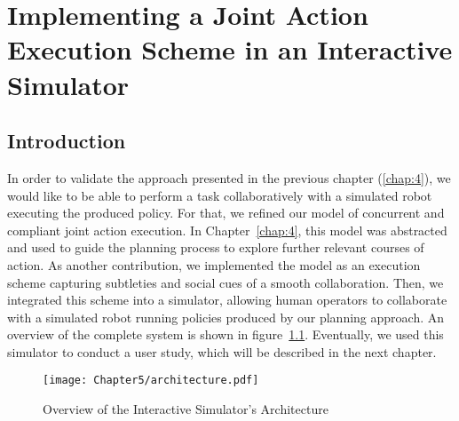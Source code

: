 \cleardoublepage

\ifdefined{}
\else
\setcounter{chapter}{4} %
\dominitoc
\faketableofcontents
\fi

\chapter{Implementing a Joint Action Execution Scheme in an Interactive Simulator}
\label{chap:5}
\minitoc


\section{Introduction}

In order to validate the approach presented in the previous chapter (\ref{chap:4}), we would like to be able to perform a task collaboratively with a simulated robot executing the produced policy.
For that, we refined our model of concurrent and compliant joint action execution. In Chapter~\ref{chap:4}, this model was abstracted and used to guide the planning process to explore further relevant courses of action. As another contribution, we implemented the model as an execution scheme capturing subtleties and social cues of a smooth collaboration. Then, we integrated this scheme into a simulator, allowing human operators to collaborate with a simulated robot running policies produced by our planning approach. An overview of the complete system is shown in figure~\ref{fig:architecture}.
Eventually, we used this simulator to conduct a user study, which will be described in the next chapter. 


\begin{figure}[h]
    \texttt{[image: Chapter5/architecture.pdf]}
    \caption{Overview of the Interactive Simulator's Architecture}
    \label{fig:architecture}
\end{figure}

